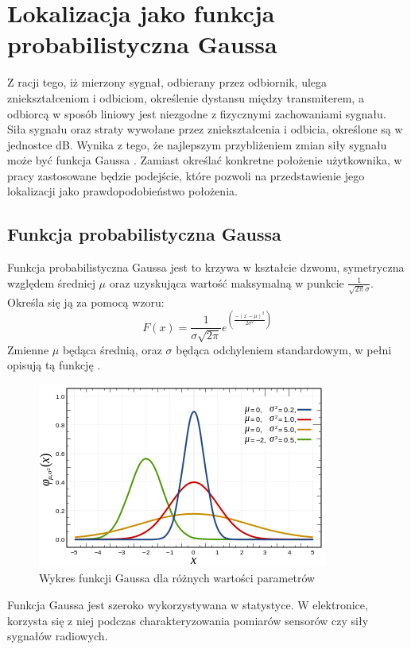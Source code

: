 \section{Lokalizacja jako funkcja probabilistyczna Gaussa}
Z racji tego, iż mierzony sygnał, odbierany przez odbiornik, ulega zniekształceniom i odbiciom, określenie dystansu między transmiterem, a odbiorcą w sposób liniowy jest niezgodne z fizycznymi zachowaniami sygnału. Siła sygnału oraz straty wywołane przez zniekształcenia i odbicia, określone są w jednostce dB. Wynika z tego, że najlepszym przybliżeniem zmian siły sygnału może być funkcja Gaussa \cite{GMBF}. Zamiast określać konkretne położenie użytkownika, w pracy zastosowane będzie podejście, które pozwoli na przedstawienie jego lokalizacji jako prawdopodobieństwo położenia.\\
\subsection{Funkcja probabilistyczna Gaussa}
Funkcja probabilistyczna Gaussa jest to krzywa w kształcie dzwonu, symetryczna względem średniej $\mu$ oraz uzyskująca wartość maksymalną w punkcie $\frac{1}{\sqrt{2\pi}\sigma}$.
Określa się ją za pomocą wzoru:
\begin{equation}
F(x) = \frac{1}{\sigma\sqrt{2\pi}}e^{\left(\frac{-(x-\mu)^2}{2\sigma^2}\right)}
\end{equation}
Zmienne $\mu$ będąca średnią, oraz $\sigma$ będąca odchyleniem standardowym, w pełni opisują tą funkcję \cite{MIR}.
\begin{figure}[H]			
	\centering
	\caption{Wykres funkcji Gaussa dla różnych wartości parametrów}
	\includegraphics{funkcja_Gaussa}
\end{figure}
Funkcja Gaussa jest szeroko wykorzystywana w statystyce. W elektronice, korzysta się z niej podczas charakteryzowania pomiarów sensorów czy siły sygnałów radiowych.
